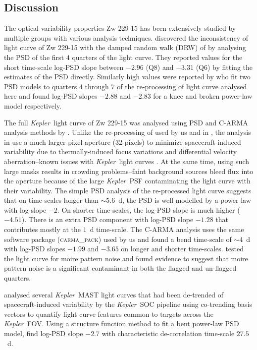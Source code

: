 \documentclass[a4paper,fleqn,usenatbib]{mnras}
\newcommand{\Kepler}{\textit{Kepler~}}
\begin{document}
\subsection[Discussion]{Discussion}\label{sec:Compare}

The optical variability properties Zw 229-15 has been extensively studied by multiple groups with various analysis techniques. \citet{Mushotzky11} discovered the inconsistency of light curve of Zw 229-15 with the damped random walk (DRW) of \citet{Kelly09} by analysing the PSD of the first $4$ quarters of the light curve. They reported values for the short time-scale log-PSD slope between $-2.96$ (Q$8$) and $-3.31$ (Q$6$) by fitting the estimates of the PSD directly. Similarly high values were reported by \citet{Carini12} who fit two PSD models to quarters $4$ through $7$ of the re-processing of light curve analysed here and found log-PSD slopes $-2.88$ and $-2.83$ for a knee and broken power-law model respectively. 

The full \Kepler light curve of Zw 229-15 was analysed using PSD and C-ARMA analysis methods by \citet{Edelson14}. Unlike the re-processing of \citet{CariniWilliamsAAS} used by us and in \citet{Kasliwal15b}, the analysis in \citet{Edelson14} use a much larger pixel-aperture ($32$-pixels) to minimize spacecraft-induced variability due to thermally-induced focus variations and differential velocity aberration--known issues with \Kepler light curves \citep{Kinemuchi12}. At the same time, using such large masks results in crowding problems--faint background sources bleed flux into the aperture because of the large \Kepler PSF contaminating the light curve with their variability. The simple PSD analysis of the re-processed light curve suggests that on time-scales longer than $\sim 5.6$~d, the PSD is well modelled by a power law with log-slope $-2$. On shorter time-scales, the log-PSD slope is much higher ($-4.51$). There is an extra PSD component with log-PSD slope $-1.28$ that contributes mostly at the $1$~d time-scale. The C-ARMA analysis uses the same software package (\textsc{carma\_pack}) used by us and found a bend time-scale of $\sim 4$~d with log-PSD slopes $-1.99$ and $-3.65$ on longer and shorter time-scales. \citet{Edelson14} tested the light curve for moire pattern noise and found evidence to suggest that moire pattern noise is a significant contaminant in both the flagged and un-flagged quarters. 

\citet{Kasliwal15} analysed several \Kepler MAST light curves that had been de-trended of spacecraft-induced variability by the \Kepler SOC pipeline using co-trending basis vectors to quantify light curve features common to targets across the \Kepler FOV. Using a structure function method to fit a bent power-law PSD model, \citet{Kasliwal15} find log-PSD slope $-2.7$ with characteristic de-correlation time-scale $27.5$~d. 
\end{document}
